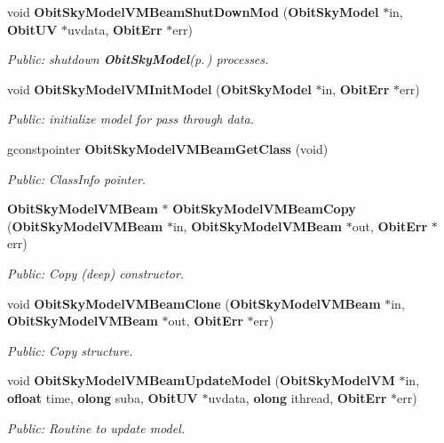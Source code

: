 \begin{CompactItemize}
void {\bf Obit\-Sky\-Model\-VMBeam\-Shut\-Down\-Mod} ({\bf Obit\-Sky\-Model} $\ast$in, {\bf Obit\-UV} $\ast$uvdata, {\bf Obit\-Err} $\ast$err)
\begin{CompactList}\small\item\em Public: shutdown {\bf Obit\-Sky\-Model}{\rm (p.\,\pageref{structObitSkyModel})} processes. \item\end{CompactList}\item 
void {\bf Obit\-Sky\-Model\-VMInit\-Model} ({\bf Obit\-Sky\-Model} $\ast$in, {\bf Obit\-Err} $\ast$err)
\begin{CompactList}\small\item\em Public: initialize model for pass through data. \item\end{CompactList}\item 
gconstpointer {\bf Obit\-Sky\-Model\-VMBeam\-Get\-Class} (void)
\begin{CompactList}\small\item\em Public: Class\-Info pointer. \item\end{CompactList}\item 
{\bf Obit\-Sky\-Model\-VMBeam} $\ast$ {\bf Obit\-Sky\-Model\-VMBeam\-Copy} ({\bf Obit\-Sky\-Model\-VMBeam} $\ast$in, {\bf Obit\-Sky\-Model\-VMBeam} $\ast$out, {\bf Obit\-Err} $\ast$err)
\begin{CompactList}\small\item\em Public: Copy (deep) constructor. \item\end{CompactList}\item 
void {\bf Obit\-Sky\-Model\-VMBeam\-Clone} ({\bf Obit\-Sky\-Model\-VMBeam} $\ast$in, {\bf Obit\-Sky\-Model\-VMBeam} $\ast$out, {\bf Obit\-Err} $\ast$err)
\begin{CompactList}\small\item\em Public: Copy structure. \item\end{CompactList}\item 
void {\bf Obit\-Sky\-Model\-VMBeam\-Update\-Model} ({\bf Obit\-Sky\-Model\-VM} $\ast$in, {\bf ofloat} time, {\bf olong} suba, {\bf Obit\-UV} $\ast$uvdata, {\bf olong} ithread, {\bf Obit\-Err} $\ast$err)
\begin{CompactList}\small\item\em Public: Routine to update model. \item\end{CompactList}\item 

\end{CompactItemize}
